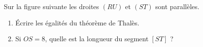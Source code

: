 
\begin{exercice}\label{exo2smath-0134}

    Sur la figure suivante les droites \( (RU)\) et \( (ST) \) sont parallèles.
\begin{center}
   
\end{center}

\begin{enumerate}
    \item
        Écrire les égalités du théorème de Thalès.
    \item
        Si \( OS=8\), quelle est la longueur du segment \( [ST]\) ?
\end{enumerate}


\end{exercice}
